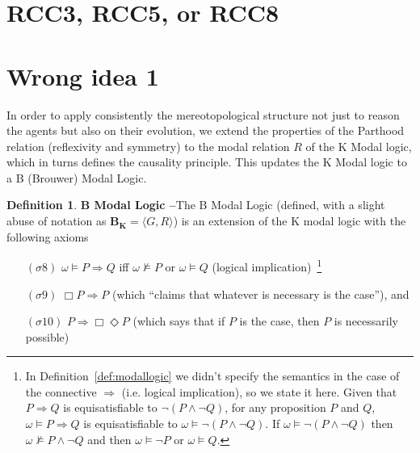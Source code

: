 \documentclass{article}
\theoremstyle{definition}
\newtheorem{definition}{Definition}[section]
\theoremstyle{corollary}
\theoremstyle{lemma}
\theoremstyle{theorem}
\theoremstyle{theorem}
\newcommand{\bframe}{\mathbf{B_K}}
\newcommand{\possibleworlds}{G}
\newcommand{\modalrelation}{R}
\newcommand{\world}{\omega}
\newcommand{\interpretation}{\sigma}
\begin{document}
\begin{appendices}
	\section{RCC3, RCC5, or RCC8}\label{app:rcc}
	\section{Wrong idea 1}
In order to apply consistently the mereotopological structure not just to
reason the agents but also on their evolution, we extend the properties of the
Parthood relation (reflexivity and symmetry) to the modal relation
$\modalrelation$ of the K Modal logic, which in turns defines the causality
principle. This updates the K Modal logic to a B (Brouwer) Modal Logic\autocite{Garson2018modal}.

\begin{definition}{\bf B Modal Logic --}\label{thm:bk-parthood}
	The B Modal Logic (defined, with a slight abuse of notation as
	$\bframe=\langle\possibleworlds,\modalrelation\rangle$) is an extension
	of the K modal logic with the following axioms
	\begin{enumerate}[noitemsep]
		\item[$(\interpretation8)$] $\world\models P\Rightarrow Q$ iff
			$\world\not\models P$ or $\world\models Q$ (logical implication)~\footnote{In
			Definition~\ref{def:modallogic} we didn't specify the
			semantics in the case of the connective $\Rightarrow$
			(i.e. logical implication), so we state it here. Given
			that $P\Rightarrow Q$ is equisatisfiable to
			$\neg(P\wedge \neg Q)$, for any proposition $P$ and
			$Q$, $\world\models P\Rightarrow Q$ is equisatisfiable
			to $\world\models \neg(P\wedge \neg Q)$. If
			$\world\models \neg(P\wedge \neg Q)$ then
			$\world\not\models P\wedge\neg Q$ and then
			$\world\models \neg P$ or $\world\models Q$.}
		\item[$(\interpretation9)$] $\Box P\Rightarrow P$ (which ``claims that whatever is necessary is the case''\autocite{Garson2018modal}), and
		\item[$(\interpretation10)$] $P\Rightarrow\Box\Diamond P$
			(which says that if $P$ is the case, then $P$ is
			necessarily possible\autocite{Garson2018modal})
	\end{enumerate}
\end{definition}


\end{appendices}
\end{document}
